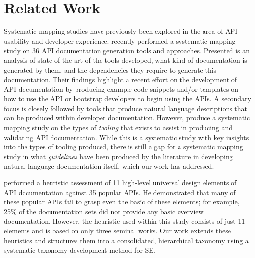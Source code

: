 \section{Related Work}
\label{esem2019:sec:related-work}

Systematic mapping studies have previously been explored in the area of API usability and developer experience. \citet{Nybom:2018ef} recently performed a systematic mapping study on 36 API documentation generation tools and approaches. Presented is an analysis of state-of-the-art of the tools developed, what kind of documentation is generated by them, and the dependencies they require to generate this documentation. Their findings highlight a recent effort on the development of API documentation by producing example code snippets and/or templates on how to use the API or bootstrap developers to begin using the APIs. A secondary focus is closely followed by tools that produce natural language descriptions that can be produced within developer documentation. %
However, \citeauthor{Nybom:2018ef} produce a systematic mapping study on the types of \textit{tooling} that exists to assist in producing and validating API documentation. While this is a systematic study with key insights into the types of tooling produced, there is still a gap for a systematic mapping study in what \textit{guidelines} have been produced by the literature in developing natural-language documentation itself, which our work has addressed.

\citet{Watson:2012uy} performed a heuristic assessment of 11 high-level universal design elements of API documentation against 35 popular APIs. He demonstrated that many of these popular APIs fail to grasp even the basic of these elements; for example, 25\% of the documentation sets did not provide any basic overview documentation. However, the heuristic used within this study consists of just 11 elements and is based on only three seminal works. Our work extends these heuristics and structures them into a consolidated, hierarchical taxonomy using a systematic taxonomy development method for SE.

